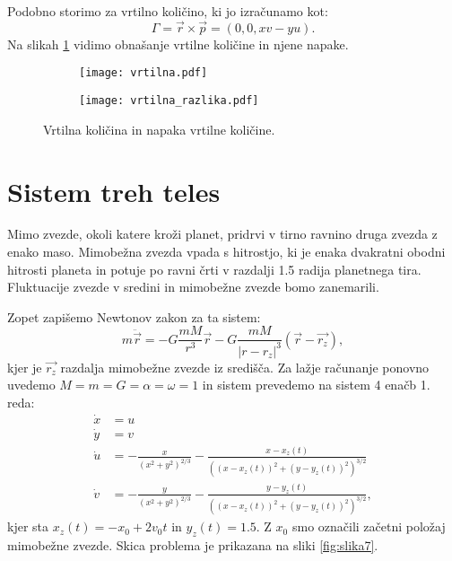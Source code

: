 \documentclass[12pt,a4paper]{article}
\begin{document}
\noindent Podobno storimo za vrtilno količino, ki jo izračunamo kot:
\begin{equation}
\Gamma = \vec{r} \times \vec{p}= (0,0, xv-yu).
\end{equation}
Na slikah \ref{fig:slika6} vidimo obnašanje vrtilne količine in njene napake.

\begin{figure}[H]
    \centering
    \begin{subfigure}[b]{0.45\textwidth}  			
        \texttt{[image: vrtilna.pdf]}
    \end{subfigure}
    \begin{subfigure}[b]{0.45\textwidth}  			
        \texttt{[image: vrtilna\_razlika.pdf]}
    \end{subfigure}
    \caption{Vrtilna količina  in napaka vrtilne količine.} \label{fig:slika6}
\end{figure}


\section*{Sistem treh teles}

Mimo zvezde, okoli katere kroži planet, pridrvi v tirno ravnino druga zvezda z enako maso. Mimobežna zvezda vpada s hitrostjo, ki je enaka dvakratni obodni hitrosti planeta in potuje po ravni črti v razdalji 1.5 radija planetnega tira. Fluktuacije zvezde v sredini in mimobežne zvezde bomo zanemarili.


Zopet zapišemo Newtonov zakon za ta sistem:
\begin{equation}
m\ddot{\vec{r}} = -G\frac{mM}{r^{3}} \vec{r} - G \frac{mM}{|r-r_z| ^{3}} (\vec{r} - \vec{r_z}), 
\end{equation}
kjer je $\vec{r_z}$ razdalja mimobežne zvezde iz središča. Za lažje računanje ponovno uvedemo $M=m=G=\alpha=\omega=1$ in sistem prevedemo na sistem 4 enačb 1. reda:
\begin{align*}
\dot{x}&= u \\
\dot{y}&=v \\
\dot{u}&= - \frac{x}{(x^2 +y^2)^{2/3}} - \frac{x-x_z(t)}{\left( (x-x_z(t))^{2} + (y-y_z(t))^{2} \right)^{3/2}} \\
\dot{v}&= - \frac{y}{(x^2 +y^2)^{2/3}} -\frac{y-y_z(t)}{\left( (x-x_z(t))^{2} + (y-y_z(t))^{2} \right)^{3/2}},
\end{align*}
kjer sta $x_z(t)= -x_0 +2v_0t$ in $y_z(t)= 1.5$. Z $x_0$ smo označili začetni položaj mimobežne zvezde. Skica problema je prikazana na sliki \ref{fig:slika7}.
\end{document}
